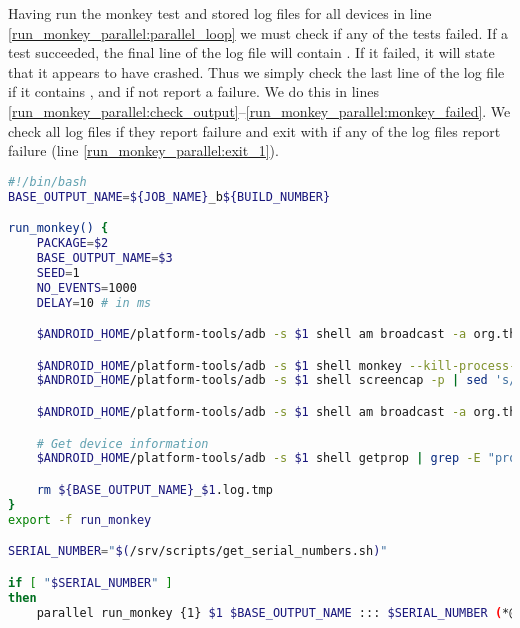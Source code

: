 Having run the monkey test and stored log files for all devices in line \ref{run_monkey_parallel:parallel_loop} we must check if any of the tests failed. If a test succeeded, the final line of the log file will contain . If it failed, it will state that it appears to have crashed. Thus we simply check the last line of the log file if it contains , and if not report a failure. We do this in lines \ref{run_monkey_parallel:check_output}--\ref{run_monkey_parallel:monkey_failed}. We check all log files if they report failure and exit with  if any of the log files report failure (line \ref{run_monkey_parallel:exit_1}).

\begin{lstlisting}[language=bash,caption=Script that runs monkey tests on all connected devices in parallel,label=lst:run_monkey_parallel]
#!/bin/bash
BASE_OUTPUT_NAME=${JOB_NAME}_b${BUILD_NUMBER}

run_monkey() {
    PACKAGE=$2
    BASE_OUTPUT_NAME=$3
    SEED=1
    NO_EVENTS=1000
    DELAY=10 # in ms

    $ANDROID_HOME/platform-tools/adb -s $1 shell am broadcast -a org.thisisafactory.simiasque.SET_OVERLAY --ez enable true(*@\label{run_monkey_parallel:go_away_monkey_true}@*)

    $ANDROID_HOME/platform-tools/adb -s $1 shell monkey --kill-process-after-error -v -v -s $SEED --throttle $DELAY -p $PACKAGE $NO_EVENTS > ${BASE_OUTPUT_NAME}_$1.log.tmp (*@\label{run_monkey_parallel:run_monkey_test}@*)
    $ANDROID_HOME/platform-tools/adb -s $1 shell screencap -p | sed 's/\r$//' > ${BASE_OUTPUT_NAME}_$1.png (*@\label{run_monkey_parallel:screenshot}@*)

    $ANDROID_HOME/platform-tools/adb -s $1 shell am broadcast -a org.thisisafactory.simiasque.SET_OVERLAY --ez enable false(*@\label{run_monkey_parallel:go_away_monkey_false}@*)

    # Get device information
    $ANDROID_HOME/platform-tools/adb -s $1 shell getprop | grep -E "product|sdk|serial" | grep -v ro.boot | cat - ${BASE_OUTPUT_NAME}_$1.log.tmp > ${BASE_OUTPUT_NAME}_$1.log (*@\label{run_monkey_parallel:device_info}@*)

    rm ${BASE_OUTPUT_NAME}_$1.log.tmp
}
export -f run_monkey

SERIAL_NUMBER="$(/srv/scripts/get_serial_numbers.sh)"

if [ "$SERIAL_NUMBER" ]
then
    parallel run_monkey {1} $1 $BASE_OUTPUT_NAME ::: $SERIAL_NUMBER (*@\label{run_monkey_parallel:parallel_loop}@*)


\end{lstlisting}
